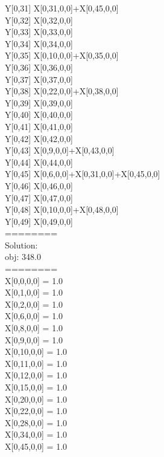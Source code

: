 \documentclass[11pt]{article}
\begin{document}
        Y[0,31] \leq X[0,31,0,0]+X[0,45,0,0]\\
        Y[0,32] \leq X[0,32,0,0]\\
        Y[0,33] \leq X[0,33,0,0]\\
        Y[0,34] \leq X[0,34,0,0]\\
        Y[0,35] \leq X[0,10,0,0]+X[0,35,0,0]\\
        Y[0,36] \leq X[0,36,0,0]\\
        Y[0,37] \leq X[0,37,0,0]\\
        Y[0,38] \leq X[0,22,0,0]+X[0,38,0,0]\\
        Y[0,39] \leq X[0,39,0,0]\\
        Y[0,40] \leq X[0,40,0,0]\\
        Y[0,41] \leq X[0,41,0,0]\\
        Y[0,42] \leq X[0,42,0,0]\\
        Y[0,43] \leq X[0,9,0,0]+X[0,43,0,0]\\
        Y[0,44] \leq X[0,44,0,0]\\
        Y[0,45] \leq X[0,6,0,0]+X[0,31,0,0]+X[0,45,0,0]\\
        Y[0,46] \leq X[0,46,0,0]\\
        Y[0,47] \leq X[0,47,0,0]\\
        Y[0,48] \leq X[0,10,0,0]+X[0,48,0,0]\\
        Y[0,49] \leq X[0,49,0,0]\\
========\\
Solution:\\
obj: 348.0\\
========\\
X[0,0,0,0] = 1.0\\
X[0,1,0,0] = 1.0\\
X[0,2,0,0] = 1.0\\
X[0,6,0,0] = 1.0\\
X[0,8,0,0] = 1.0\\
X[0,9,0,0] = 1.0\\
X[0,10,0,0] = 1.0\\
X[0,11,0,0] = 1.0\\
X[0,12,0,0] = 1.0\\
X[0,15,0,0] = 1.0\\
X[0,20,0,0] = 1.0\\
X[0,22,0,0] = 1.0\\
X[0,28,0,0] = 1.0\\
X[0,34,0,0] = 1.0\\
X[0,45,0,0] = 1.0\\
\end{document}
